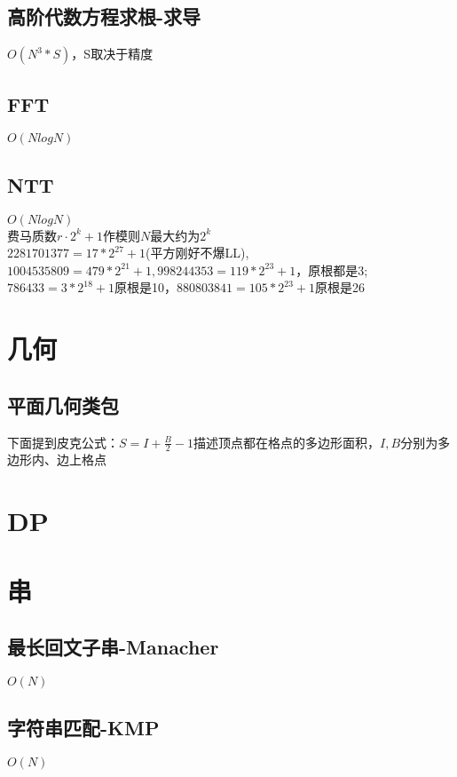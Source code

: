 \documentclass[10pt]{article}
\begin{document}
\subsection{高阶代数方程求根-求导}
$O(N^3*S)$，S取决于精度


\subsection{FFT}
$O(NlogN)$


\subsection{NTT}
$O(NlogN)$\\
费马质数$r\cdot 2^k+1$作模则$N$最大约为$2^k$\\
$2281701377=17*2^{27}+1$(平方刚好不爆LL), $1004535809=479*2^{21}+1, 998244353=119*2^{23}+1$，原根都是3;\\
$786433=3*2^{18}+1$原根是10，$880803841=105*2^{23}+1$原根是26

\section{几何}
\subsection{平面几何类包}
下面提到皮克公式：$S=I+\frac{B}{2}-1$描述顶点都在格点的多边形面积，$I, B$分别为多边形内、边上格点

\section{DP}
\section{串}
\subsection{最长回文子串-Manacher}
$O(N)$


\subsection{字符串匹配-KMP}
$O(N)$

\end{document}
